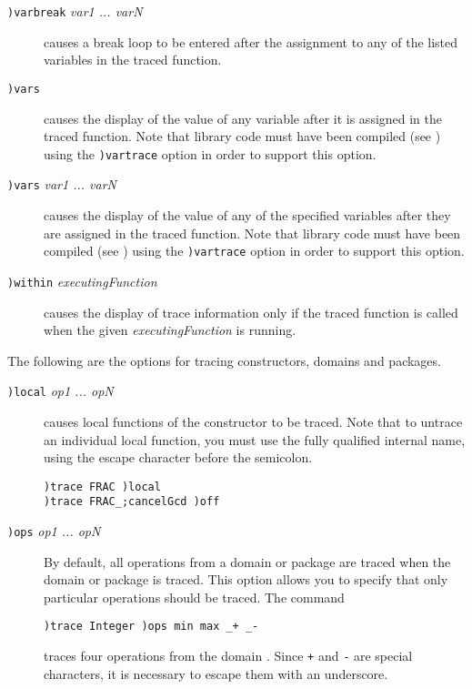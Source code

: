 {{{{{{{\begin{description}

\item[{\tt )varbreak} {\it var1 \lanb{}... varN\ranb{}}]
causes a \Lisp{} break loop to be entered after
the assignment to any of the listed variables in the traced
function.

\item[{\tt )vars}]
causes the display of the value of any variable after it is
assigned in the traced function.
Note that library code must
have been compiled (see )
using the {\tt )vartrace} option in order
to support this option.

\item[{\tt )vars} {\it var1 \lanb{}... varN\ranb{}}]
causes the display of the value of any of the specified variables
after they are assigned in the traced function.
Note that library code must
have been compiled (see )
using the {\tt )vartrace} option in order
to support this option.

\item[{\tt )within} {\it executingFunction}]
causes the display of trace information only if the traced
function is called when the given {\it executingFunction} is running.
\end{description}

The following are the options for tracing constructors, domains
and packages.

\begin{description}
\item[{\tt )local} {\it \lanb{}op1 \lanb{}... opN\ranb{}\ranb{}}]
causes local functions of the constructor to be traced.  Note that
to untrace an individual local function, you must use the fully
qualified internal name, using the escape character
\spadSyntax{_} before the semicolon.
\begin{verbatim}
)trace FRAC )local
)trace FRAC_;cancelGcd )off
\end{verbatim}

\item[{\tt )ops} {\it op1 \lanb{}... opN\ranb{}}]
By default, all operations from a domain or package are traced
when the domain or package is traced.  This option allows you to
specify that only particular operations should be traced.  The
command
%
\begin{verbatim}
)trace Integer )ops min max _+ _-
\end{verbatim}
%
traces four operations from the domain .  Since
{\tt +} and {\tt -} are special
characters, it is necessary
to escape them with an underscore.
\end{description}

}}}}}}}
